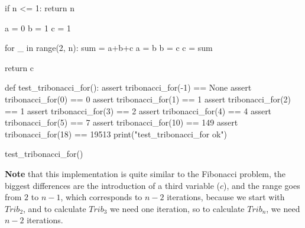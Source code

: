 \documentclass[12pt]{article}
\begin{document}
\begin{enumerate}[a)]
\begin{pythonlst}
  if n <= 1:
    return n

  a = 0
  b = 1
  c = 1
  
  for _ in range(2, n):
    sum = a+b+c
    a = b
    b = c
    c = sum

  return c

def test_tribonacci_for():
  assert tribonacci_for(-1) == None
  assert tribonacci_for(0) == 0
  assert tribonacci_for(1) == 1
  assert tribonacci_for(2) == 1
  assert tribonacci_for(3) == 2
  assert tribonacci_for(4) == 4
  assert tribonacci_for(5) == 7
  assert tribonacci_for(10) == 149
  assert tribonacci_for(18) == 19513
  print("test_tribonacci_for ok")

test_tribonacci_for()
\end{pythonlst}
\textbf{Note} that this implementation is quite similar to the Fibonacci problem,
the biggest differences are the introduction of a third variable ($c$), and the
range goes from $2$ to $n-1$, which corresponds to $n-2$ iterations, because we
start with $Trib_{2}$, and to calculate $Trib_{3}$ we need one iteration, so to 
calculate $Trib_{n}$, we need $n-2$ iterations.
\end{enumerate}
\end{document}
